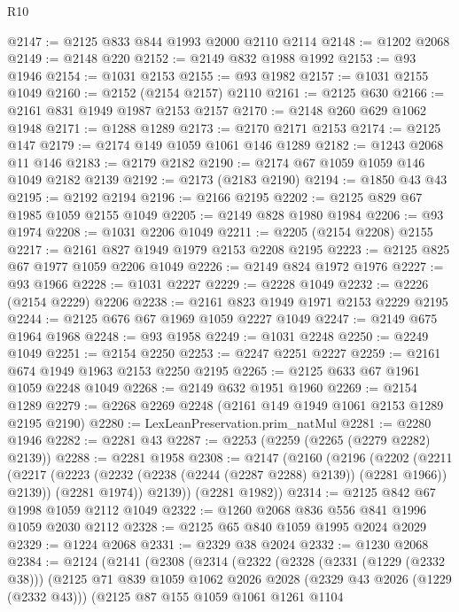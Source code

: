 \begin{lexlean}{R10}
\begin{coremodule}
@2147 := @2125 @833 @844 @1993 @2000 @2110 @2114
@2148 := @1202 @2068
@2149 := @2148 @220
@2152 := @2149 @832 @1988 @1992
@2153 := @93 @1946
@2154 := @1031 @2153
@2155 := @93 @1982
@2157 := @1031 @2155 @1049
@2160 := @2152 (@2154 @2157) @2110
@2161 := @2125 @630
@2166 := @2161 @831 @1949 @1987 @2153 @2157
@2170 := @2148 @260 @629 @1062 @1948
@2171 := @1288 @1289
@2173 := @2170 @2171 @2153
@2174 := @2125 @147
@2179 := @2174 @149 @1059 @1061 @146 @1289
@2182 := @1243 @2068 @11 @146
@2183 := @2179 @2182
@2190 := @2174 @67 @1059 @1059 @146 @1049 @2182 @2139
@2192 := @2173 (@2183 @2190)
@2194 := @1850 @43 @43
@2195 := @2192 @2194
@2196 := @2166 @2195
@2202 := @2125 @829 @67 @1985 @1059 @2155 @1049
@2205 := @2149 @828 @1980 @1984
@2206 := @93 @1974
@2208 := @1031 @2206 @1049
@2211 := @2205 (@2154 @2208) @2155
@2217 := @2161 @827 @1949 @1979 @2153 @2208 @2195
@2223 := @2125 @825 @67 @1977 @1059 @2206 @1049
@2226 := @2149 @824 @1972 @1976
@2227 := @93 @1966
@2228 := @1031 @2227
@2229 := @2228 @1049
@2232 := @2226 (@2154 @2229) @2206
@2238 := @2161 @823 @1949 @1971 @2153 @2229 @2195
@2244 := @2125 @676 @67 @1969 @1059 @2227 @1049
@2247 := @2149 @675 @1964 @1968
@2248 := @93 @1958
@2249 := @1031 @2248
@2250 := @2249 @1049
@2251 := @2154 @2250
@2253 := @2247 @2251 @2227
@2259 := @2161 @674 @1949 @1963 @2153 @2250 @2195
@2265 := @2125 @633 @67 @1961 @1059 @2248 @1049
@2268 := @2149 @632 @1951 @1960
@2269 := @2154 @1289
@2279 := @2268 @2269 @2248 (@2161 @149 @1949 @1061 @2153 @1289 @2195 @2190)
@2280 := LexLeanPreservation.prim_natMul
@2281 := @2280 @1946
@2282 := @2281 @43
@2287 := @2253 (@2259 (@2265 (@2279 @2282) @2139))
@2288 := @2281 @1958
@2308 := @2147
    (@2160
      (@2196
        (@2202
          (@2211
            (@2217 (@2223 (@2232 (@2238 (@2244 (@2287 @2288) @2139)) (@2281 @1966)) @2139))
            (@2281 @1974))
          @2139))
      (@2281 @1982))
@2314 := @2125 @842 @67 @1998 @1059 @2112 @1049
@2322 := @1260 @2068 @836 @556 @841 @1996 @1059 @2030 @2112
@2328 := @2125 @65 @840 @1059 @1995 @2024 @2029
@2329 := @1224 @2068
@2331 := @2329 @38 @2024
@2332 := @1230 @2068
@2384 := @2124
    (@2141
      (@2308
        (@2314
          (@2322
            (@2328
              (@2331 (@1229 (@2332 @38)))
              (@2125
                @71
                @839
                @1059
                @1062
                @2026
                @2028
                (@2329 @43 @2026 (@1229 (@2332 @43)))
                (@2125
                  @87
                  @155
                  @1059
                  @1061
                  @1261
                  @1104

\end{coremodule}
\end{lexlean}
